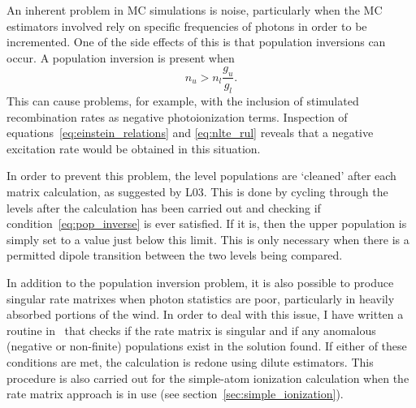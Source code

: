 An inherent problem in MC simulations is noise, particularly
when the MC estimators involved rely on specific frequencies of
photons in order to be incremented. One of the side effects
of this is that population inversions can occur. A population
inversion is present when 
\begin{equation}
n_u > n_l \frac{g_u}{g_l}.
\label{eq:pop_inverse}
\end{equation}
This can cause problems, for example, with the inclusion
of stimulated recombination rates as negative photoionization
terms. Inspection of equations~\ref{eq:einstein_relations} 
and \ref{eq:nlte_rul} reveals that a negative
excitation rate would be obtained in this situation.

In order to prevent this problem, the level populations are `cleaned' 
after each matrix calculation, as suggested by L03. 
This is done by cycling through the levels
after the calculation has been carried out and checking if
condition~\ref{eq:pop_inverse} is ever satisfied. If it is, then
the upper population is simply set to a value just below this limit.
This is only necessary when there is a permitted dipole transition 
between the two levels being compared.

In addition to the population inversion problem, it is also possible to 
produce singular rate matrixes when photon statistics are poor, 
particularly in heavily absorbed portions of the wind. 
In order to deal with this issue, I have written a routine in \py\
that checks if the rate matrix is singular and if any anomalous (negative or
non-finite) populations exist in the solution found. If either of these 
conditions are met, the calculation is redone using dilute estimators.
This procedure is also carried out for the simple-atom ionization
calculation when the rate matrix approach is in use 
(see section~\ref{sec:simple_ionization}).